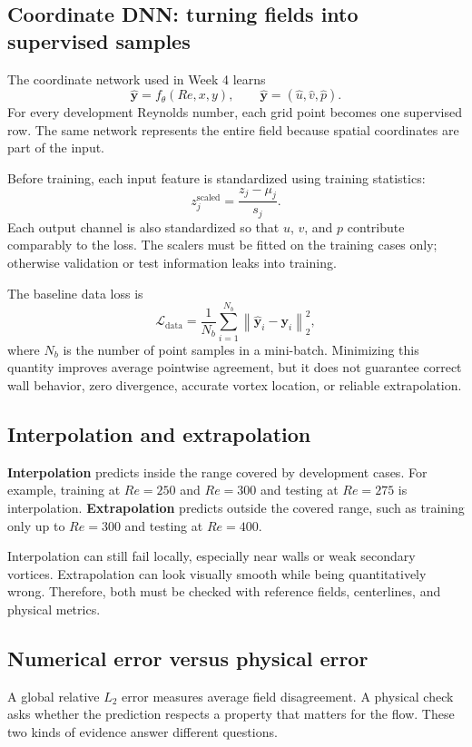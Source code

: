 \documentclass[11pt]{article}
\begin{document}
\subsection{Coordinate DNN: turning fields into supervised samples}
The coordinate network used in Week 4 learns
\[
\widehat{\mathbf y}=f_{\theta}(Re,x,y),
\qquad
\widehat{\mathbf y}=(\hat u,\hat v,\hat p).
\]
For every development Reynolds number, each grid point becomes one supervised row. The same network represents the entire field because spatial coordinates are part of the input.

Before training, each input feature is standardized using training statistics:
\[
z_j^{\mathrm{scaled}}=\frac{z_j-\mu_j}{s_j}.
\]
Each output channel is also standardized so that $u$, $v$, and $p$ contribute comparably to the loss. The scalers must be fitted on the training cases only; otherwise validation or test information leaks into training.

The baseline data loss is
\[
\mathcal L_{\mathrm{data}}
=\frac{1}{N_b}\sum_{i=1}^{N_b}
\left\|\widehat{\mathbf y}_i-\mathbf y_i\right\|_2^2,
\]
where $N_b$ is the number of point samples in a mini-batch. Minimizing this quantity improves average pointwise agreement, but it does not guarantee correct wall behavior, zero divergence, accurate vortex location, or reliable extrapolation.

\subsection{Interpolation and extrapolation}
\textbf{Interpolation} predicts inside the range covered by development cases. For example, training at $Re=250$ and $Re=300$ and testing at $Re=275$ is interpolation. \textbf{Extrapolation} predicts outside the covered range, such as training only up to $Re=300$ and testing at $Re=400$.

Interpolation can still fail locally, especially near walls or weak secondary vortices. Extrapolation can look visually smooth while being quantitatively wrong. Therefore, both must be checked with reference fields, centerlines, and physical metrics.

\subsection{Numerical error versus physical error}
A global relative $L_2$ error measures average field disagreement. A physical check asks whether the prediction respects a property that matters for the flow. These two kinds of evidence answer different questions.
\end{document}
